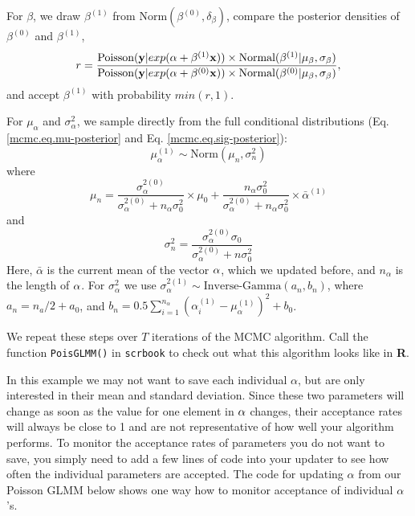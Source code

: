 For $\beta$, we draw $\beta^{(1)}$ from $\mbox{Norm} (\beta^{(0)}, \delta_{\beta})$, compare the posterior densities of $\beta^{(0)}$ and $\beta^{(1)}$,
\[
r = \frac{\mbox{Poisson}({\bf y}|exp({\bf \alpha} + \beta^{(1)}{\bf x}))
  \times\mbox{Normal}(\beta^{(1)}|\mu_{\beta}, \sigma_{\beta})} { \mbox{Poisson}({\bf
    y}|exp({\bf \alpha} + \beta^{(0)}{\bf x})) \times \mbox{Normal}(\beta^{(0)}|\mu_{\beta}, \sigma_{\beta})},
\]
and accept $\beta^{(1)}$  with probability $min(r,1)$.

For $\mu_{\alpha}$ and $\sigma_{\alpha}^2$, we sample directly from the full conditional distributions (Eq. \ref{mcmc.eq.mu-posterior}  and Eq. \ref{mcmc.eq.sig-posterior}):
\[
\mu_{\alpha}^{(1)} \sim \mbox{Norm} (\mu_n, \sigma_n^2)
\]
where
\[\mu_n =  \frac{\sigma_{\alpha}^{2(0)}}  {\sigma_{\alpha}^{2(0)}   +n_{\alpha}    \sigma_0^2} \times  \mu_0 +  \frac{n_{\alpha}  \sigma_0^2} {\sigma_{\alpha}^{2(0)}   +n_{\alpha} \sigma_0^2} \times \bar{\alpha}^{(1)}
\]
and
\[
\sigma_n^2= \frac{\sigma_{\alpha}^{2(0)}   \sigma_0 } {\sigma_{\alpha}^{2(0)}  + n \sigma_0^2}
\]
Here, $\bar{\alpha}$ is the current mean of the vector ${\bf\alpha}$, which we
updated before, and $n_{\alpha}$ is the length of ${\bf\alpha}$.
For $\sigma_{\alpha}^2$ we use $\sigma_{\alpha}^{2(1)}\sim \mbox{Inverse-Gamma} (a_n, b_n)$,
where  $a_n = n_a/2   + a_0$, and $b_n = 0.5  \displaystyle\sum\limits_{i=1}^{n_{\alpha}} (\alpha_i^{(1)}-\mu_{\alpha}^{(1)})^2+ b_0$.


We repeat these steps over $T$ iterations of the MCMC algorithm. Call
the function \mbox{\tt PoisGLMM()} in \mbox{\tt scrbook} to check out
what this algorithm looks like in {\bf R}.

In this example we may not want to save each individual $\alpha$, but
are only interested in their mean and standard deviation. Since these
two parameters will change as soon as the value for one element in
$\bf{\alpha}$ changes, their acceptance rates will always be close to
1 and are not representative of how well your algorithm performs. To
monitor the acceptance rates of parameters you do not want to save,
you simply need to add a few lines of code into your updater to see
how often the individual parameters are accepted. The code for
updating {\bf $\alpha$} from our Poisson GLMM below shows one way how to
monitor acceptance of individual $\alpha$'s.

